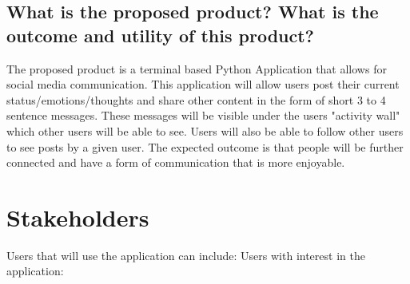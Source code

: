 \documentclass[12pt, titlepage]{article}
\begin{document}
\subsection{What is the proposed product? What is the outcome and utility of this product?}
The proposed product is a terminal based Python Application that allows for social media communication. This application will allow users post their current status/emotions/thoughts and share other content in the form of short 3 to 4 sentence messages. These messages will be visible under the users "activity wall" which other users will be able to see. Users will also be able to follow other users to see posts by a given user. The expected outcome is that people will be further connected and have a form of communication that is more enjoyable.
\newpage

\section{Stakeholders}
Users that will use the application can include:
Users with interest in the application:
\end{document}
